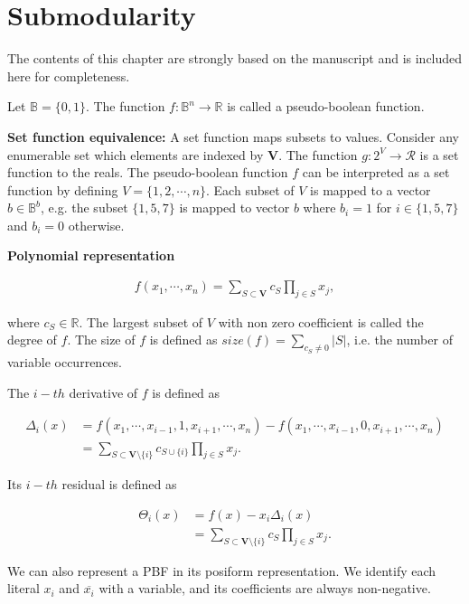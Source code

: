 \chapter{Submodularity}\label{chapter:submodularity}

The contents of this chapter are strongly based on the manuscript \cite{} and is included here for completeness.

Let $\mathbb{B} = \{0,1\}$. The function $f:\mathbb{B}^n\rightarrow\mathbb{R}$ is called a pseudo-boolean function.

\textbf{Set function equivalence:} A set function maps subsets to values. Consider any enumerable set which elements are indexed by $\mathbf{V}$. The function $g:2^V\rightarrow \mathcal{R}$ is a set function to the reals. The pseudo-boolean function $f$ can be interpreted as a set function by defining $V=\{1,2,\cdots,n\}$. Each subset of $V$ is mapped to a vector $b \in \mathbb{B}^b$, e.g. the subset $\{1,5,7\}$ is mapped to vector $b$ where $b_i=1$ for $i \in \{1,5,7\}$ and $b_i=0$ otherwise.

\textbf{Polynomial representation}

\begin{align*}
	f(x_1,\cdots, x_n) = \sum_{S \subset \mathbf{V}}{c_S\prod_{j \in S}{x_j}},
\end{align*}

where $c_S \in \mathbb{R}$. The largest subset of $V$ with non zero coefficient is called the degree of $f$. The size of $f$ is defined as $size(f) = \sum_{c_S \neq 0}{|S|}$, i.e. the number of variable occurrences. 

The $i-th$ derivative of $f$ is defined as

\begin{align*}
	\Delta_i(x) &= f(x_1,\cdots, x_{i-1},1,x_{i+1},\cdots,x_n) - f(x_1,\cdots, x_{i-1},0,x_{i+1},\cdots,x_n) \\
	&= \sum_{S \subset \mathbf{V} \setminus \{i\}}{c_{S \cup \{i\}}\prod_{j \in S}{x_j}}.
\end{align*}

Its $i-th$ residual is defined as

\begin{align*}
	\Theta_i(x) &= f(x) - x_i\Delta_i(x) \\
	&= \sum_{S \subset \mathbf{V} \setminus \{i\}}{c_{S}\prod_{j \in S}{x_j}}.	
\end{align*}

We can also represent a PBF in its posiform representation. We identify each literal $x_i$ and $\overline{x_i}$ with a variable, and its coefficients are always non-negative.

